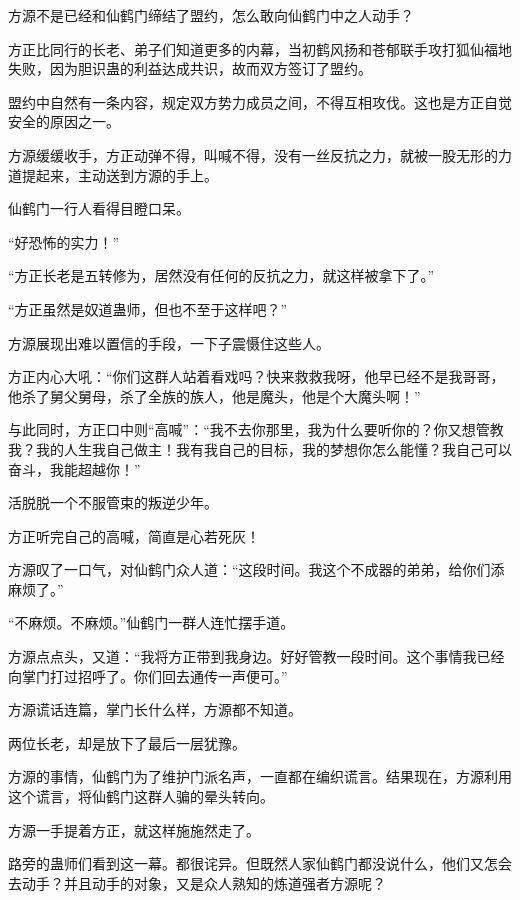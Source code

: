 
\begin{this_body}



方源不是已经和仙鹤门缔结了盟约，怎么敢向仙鹤门中之人动手？

方正比同行的长老、弟子们知道更多的内幕，当初鹤风扬和苍郁联手攻打狐仙福地失败，因为胆识蛊的利益达成共识，故而双方签订了盟约。

盟约中自然有一条内容，规定双方势力成员之间，不得互相攻伐。这也是方正自觉安全的原因之一。

方源缓缓收手，方正动弹不得，叫喊不得，没有一丝反抗之力，就被一股无形的力道提起来，主动送到方源的手上。

仙鹤门一行人看得目瞪口呆。

“好恐怖的实力！”

“方正长老是五转修为，居然没有任何的反抗之力，就这样被拿下了。”

“方正虽然是奴道蛊师，但也不至于这样吧？”

方源展现出难以置信的手段，一下子震慑住这些人。

方正内心大吼：“你们这群人站着看戏吗？快来救救我呀，他早已经不是我哥哥，他杀了舅父舅母，杀了全族的族人，他是魔头，他是个大魔头啊！”

与此同时，方正口中则“高喊”：“我不去你那里，我为什么要听你的？你又想管教我？我的人生我自己做主！我有我自己的目标，我的梦想你怎么能懂？我自己可以奋斗，我能超越你！”

活脱脱一个不服管束的叛逆少年。

方正听完自己的高喊，简直是心若死灰！

方源叹了一口气，对仙鹤门众人道：“这段时间。我这个不成器的弟弟，给你们添麻烦了。”

“不麻烦。不麻烦。”仙鹤门一群人连忙摆手道。

方源点点头，又道：“我将方正带到我身边。好好管教一段时间。这个事情我已经向掌门打过招呼了。你们回去通传一声便可。”

方源谎话连篇，掌门长什么样，方源都不知道。

两位长老，却是放下了最后一层犹豫。

方源的事情，仙鹤门为了维护门派名声，一直都在编织谎言。结果现在，方源利用这个谎言，将仙鹤门这群人骗的晕头转向。

方源一手提着方正，就这样施施然走了。

路旁的蛊师们看到这一幕。都很诧异。但既然人家仙鹤门都没说什么，他们又怎会去动手？并且动手的对象，又是众人熟知的炼道强者方源呢？


\end{this_body}

